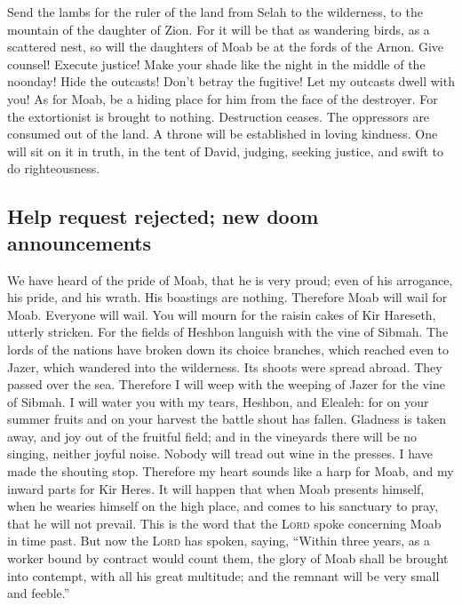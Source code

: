  Send the lambs for the ruler of the land from Selah to
the wilderness, to the mountain of the daughter of Zion. 
For it will be that as wandering birds, as a scattered nest, so will the
daughters of Moab be at the fords of the Arnon.  Give
counsel! Execute justice! Make your shade like the night in the middle
of the noonday! Hide the outcasts! Don't betray the fugitive!
 Let my outcasts dwell with you! As for Moab, be a hiding
place for him from the face of the destroyer. For the extortionist is
brought to nothing. Destruction ceases. The oppressors are consumed out
of the land.  A throne will be established in loving
kindness. One will sit on it in truth, in the tent of David, judging,
seeking justice, and swift to do righteousness.

\hypertarget{help-request-rejected-new-doom-announcements}{%
\subsection{Help request rejected; new doom
announcements}\label{help-request-rejected-new-doom-announcements}}

 We have heard of the pride of Moab, that he is very
proud; even of his arrogance, his pride, and his wrath. His boastings
are nothing.  Therefore Moab will wail for Moab. Everyone
will wail. You will mourn for the raisin cakes of Kir Hareseth, utterly
stricken.  For the fields of Heshbon languish with the
vine of Sibmah. The lords of the nations have broken down its choice
branches, which reached even to Jazer, which wandered into the
wilderness. Its shoots were spread abroad. They passed over the sea.
 Therefore I will weep with the weeping of Jazer for the
vine of Sibmah. I will water you with my tears, Heshbon, and Elealeh:
for on your summer fruits and on your harvest the battle shout has
fallen.  Gladness is taken away, and joy out of the
fruitful field; and in the vineyards there will be no singing, neither
joyful noise. Nobody will tread out wine in the presses. I have made the
shouting stop.  Therefore my heart sounds like a harp for
Moab, and my inward parts for Kir Heres.  It will happen
that when Moab presents himself, when he wearies himself on the high
place, and comes to his sanctuary to pray, that he will not prevail.
 This is the word that the \textsc{Lord} spoke concerning
Moab in time past.  But now the \textsc{Lord} has spoken,
saying, ``Within three years, as a worker bound by contract would count
them, the glory of Moab shall be brought into contempt, with all his
great multitude; and the remnant will be very small and feeble.''

